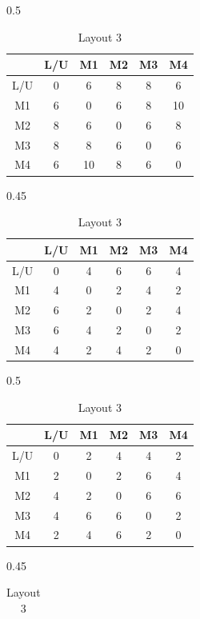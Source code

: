 \documentclass[preprint, 3p, review, 12pt]{elsarticle}
\begin{document}
\begin{table}[h!]
\begin{subtable}[c]{0.5\textwidth}
    \centering
    \begin{tabular}{c| c c c c c}
        & L/U & M1 & M2 & M3 & M4\\
    \hline
        L/U & 0 & 6 & 8 & 8 & 6\\
        M1 & 6 & 0 & 6 & 8 & 10\\
        M2 & 8 & 6 & 0 & 6 & 8\\
        M3 & 8 & 8 & 6 & 0 & 6\\
        M4 & 6 & 10 & 8 & 6 & 0\\
    \hline
    \end{tabular}
    \label{tab:l1_tra_times}
    \caption{Layout 1}
\end{subtable}
\hfill
\begin{subtable}[c]{0.45\textwidth}
    \centering
    \begin{tabular}{c| c c c c c}
        & L/U & M1 & M2 & M3 & M4\\
    \hline
        L/U & 0 & 4 & 6 & 6 & 4\\
        M1 & 4 & 0 & 2 & 4 & 2\\
        M2 & 6 & 2 & 0 & 2 & 4\\
        M3 & 6 & 4 & 2 & 0 & 2\\
        M4 & 4 & 2 & 4 & 2 & 0\\
    \hline
    \end{tabular}
    \caption{Layout 2}
    \label{tab:l2_tra_times}
\end{subtable}
\hfill
\begin{subtable}[c]{0.5\textwidth}
    \centering
    \begin{tabular}{c| c c c c c}
        & L/U & M1 & M2 & M3 & M4\\
    \hline
        L/U & 0 & 2 & 4 & 4 & 2\\
        M1 & 2 & 0 & 2 & 6 & 4\\
        M2 & 4 & 2 & 0 & 6 & 6\\
        M3 & 4 & 6 & 6 & 0 & 2\\
        M4 & 2 & 4 & 6 & 2 & 0\\
    \hline
    \end{tabular}
     \label{tab:l3_tra_times}
    \caption{Layout 3}
\end{subtable}
\hfill
\begin{subtable}[c]{0.45\textwidth}
    \centering
    \begin{tabular}{c| c c c c c}

\end{tabular}
\end{subtable}
\end{table}
\end{document}

